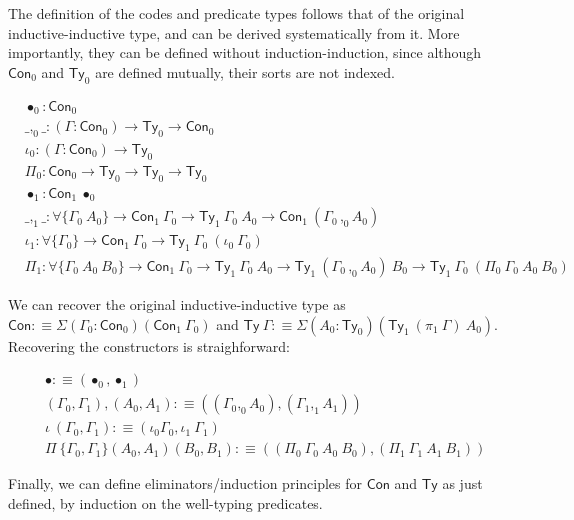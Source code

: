 \documentclass{easychair}
\newcommand{\GG}{\Gamma}
\begin{document}
The definition of the codes and predicate types follows that of the original
inductive-inductive type, and can be derived systematically from it. More
importantly, they can be defined without induction-induction, since although
$\textsf{Con}_0$ and $\textsf{Ty}_0$ are defined mutually, their sorts are not
indexed.

\begin{align*}
  & \bullet_0 : \textsf{Con}_0 \\
  & \_,_0\_ : (\GG : \textsf{Con}_0) \to \textsf{Ty}_0 \to \textsf{Con}_0 \\
  & \iota_0 : (\GG : \textsf{Con}_0) \to \textsf{Ty}_0 \\
  & \Pi_0 : \textsf{Con}_0 \to \textsf{Ty}_0 \to \textsf{Ty}_0 \to \textsf{Ty}_0 \\
  & \bullet_1 : \textsf{Con}_1\ \bullet_0 \\
  & \_,_1\_ : \forall\{\GG_0\ A_0\} \to \textsf{Con}_1\ \GG_0 \to \textsf{Ty}_1\ \GG_0\ A_0 \to \textsf{Con}_1\ (\GG_0 \,,_0 A_0) \\
  & \iota_1 : \forall\{\GG_0\} \to \textsf{Con}_1\ \GG_0 \to \textsf{Ty}_1\ \GG_0\ (\iota_0\ \GG_0) \\
  & \Pi_1 : \forall\{\GG_0\ A_0\ B_0\} \to \textsf{Con}_1\ \GG_0 \to \textsf{Ty}_1\ \GG_0\ A_0 \to \textsf{Ty}_1\ (\GG_0\, ,_0 A_0)\ B_0 \to \textsf{Ty}_1\ \GG_0\ (\Pi_0\ \GG_0\ A_0\ B_0)
\end{align*}

We can recover the original inductive-inductive type as $\textsf{Con} :\equiv
\Sigma (\GG_0 : \textsf{Con}_0)(\textsf{Con}_1\ \GG_0)$ and $\textsf{Ty}\ \GG
:\equiv \Sigma(A_0 :
\textsf{Ty}_0)(\textsf{Ty}_1\ (\pi_1\ \GG)\ A_0)$. Recovering the constructors
is straighforward:

\begin{align*}
  & \bullet :\equiv (\bullet_0 , \bullet_1) \\
  & (\GG_0 , \GG_1) , (A_0 , A_1) :\equiv ((\GG_0 ,_0 A_0) , (\GG_1 ,_1 A_1)) \\
  & \iota\ (\GG_0 , \GG_1) :\equiv (\iota_0 \GG_0 , \iota_1\ \GG_1) \\
  & \Pi\ \{\GG_0 , \GG_1\}(A_0 , A_1) (B_0 , B_1) :\equiv
    ((\Pi_0\ \GG_0\ A_0\ B_0) , (\Pi_1\ \GG_1\ A_1\ B_1))
\end{align*}

Finally, we can define eliminators/induction principles for $\textsf{Con}$ and
$\textsf{Ty}$ as just defined, by induction on the well-typing predicates.
\end{document}
